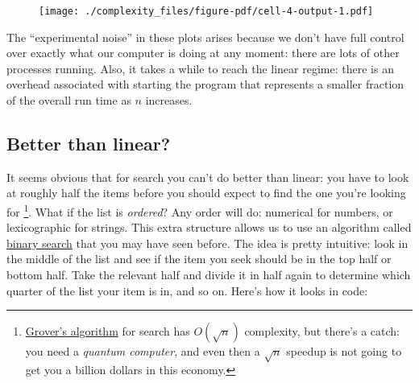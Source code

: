 \documentclass[
  letterpaper,
  DIV=11,
  numbers=noendperiod]{scrreprt}
\theoremstyle{definition}
\theoremstyle{remark}
\begin{document}
\begin{figure}[H]

{\centering \texttt{[image: ./complexity\_files/figure-pdf/cell-4-output-1.pdf]}

}

\end{figure}

The ``experimental noise'' in these plots arises because we don't have
full control over exactly what our computer is doing at any moment:
there are lots of other processes running. Also, it takes a while to
reach the linear regime: there is an overhead associated with starting
the program that represents a smaller fraction of the overall run time
as \(n\) increases.

\hypertarget{better-than-linear}{%
\subsection{Better than linear?}\label{better-than-linear}}

It seems obvious that for search you can't do better than linear: you
have to look at roughly half the items before you should expect to find
the one you're looking for \footnote{\href{https://en.wikipedia.org/wiki/Grover\%27s_algorithm}{Grover's
  algorithm} for search has \(O(\sqrt{n})\) complexity, but there's a
  catch: you need a \emph{quantum computer}, and even then a
  \(\sqrt{n}\) speedup is not going to get you a billion dollars in this
  economy.}. What if the list is \emph{ordered}? Any order will do:
numerical for numbers, or lexicographic for strings. This extra
structure allows us to use an algorithm called
\href{https://en.wikipedia.org/wiki/Binary_search_algorithm}{binary
search} that you may have seen before. The idea is pretty intuitive:
look in the middle of the list and see if the item you seek should be in
the top half or bottom half. Take the relevant half and divide it in
half again to determine which quarter of the list your item is in, and
so on. Here's how it looks in code:
\end{document}
